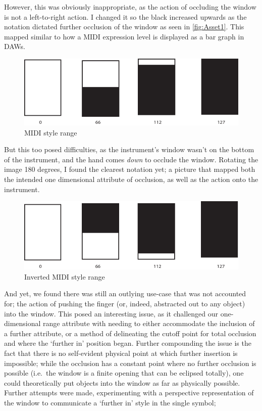 However, this was obviously inappropriate, as the action of occluding the window is not a left-to-right action.
I changed it so the black increased upwards as the notation dictated further occlusion of the window as seen in \autoref{fig:Asset1}. 
This mapped similar to how a MIDI expression level is displayed as a bar graph in DAWs. 
\begin{figure}
\includegraphics[width=\linewidth]{./resources/Asset1.pdf}
\caption{MIDI style range}\label{fig:Asset1}
\end{figure}

But this too posed difficulties, as the instrument's window wasn't on the bottom of the instrument, and the hand comes \emph{down} to occlude the window. 
Rotating the image 180 degrees, I found the clearest notation yet; a picture that mapped both the intended one dimensional attribute of occlusion, as well as the action onto the instrument.

\begin{figure}
\includegraphics[width=\linewidth]{./resources/Asset2.pdf}
\caption{Inverted MIDI style range}\label{fig:Asset2}
\end{figure}

And yet, we found there was still an outlying use-case that was not accounted for; the action of pushing the finger (or, indeed, abstracted out to any object) into the window. 
This posed an interesting issue, as it challenged our one-dimensional range attribute with needing to either accommodate the inclusion of a further attribute, or a method of delineating the cutoff point for total occlusion and where the `further in' position began. 
Further compounding the issue is the fact that there is no self-evident physical point at which further insertion is impossible; 
while the occlusion has a constant point where no further occlusion is possible (i.e.\ the window is a finite opening that can be eclipsed totally), one could theoretically put objects into the window as far as physically possible.
Further attempts were made, experimenting with a perspective representation of the window to communicate a `further in' style in the single symbol; 

